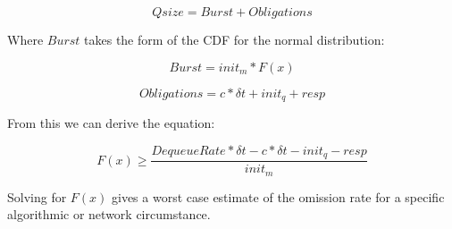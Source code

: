 \begin{equation}
Qsize = Burst + Obligations
\end{equation}

Where $Burst$ takes the form of the \ac{CDF} for the normal distribution:

\begin{equation}
Burst = init_m * F(x)  
\end{equation}

\begin{equation}
Obligations = c * \delta t + init_q + resp
\end{equation}

From this we can derive the equation:

\begin{equation}
F(x) \geq \frac{DequeueRate * \delta t - c * \delta t - init_q - resp}{init_m}
\end{equation}

Solving for $F(x)$ gives a worst case estimate of the omission rate for a specific algorithmic or network circumstance.







